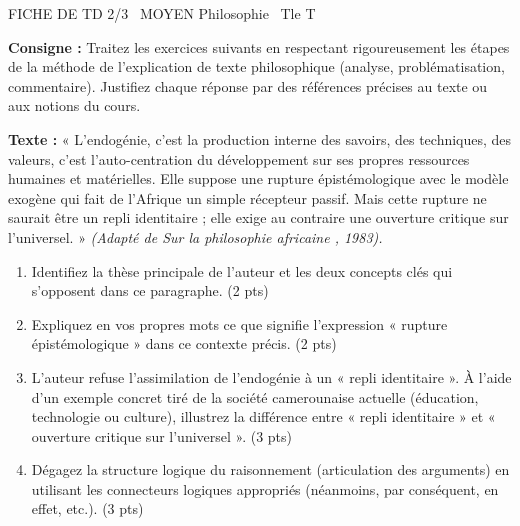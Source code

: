 \documentclass[11pt]{article}
\begin{document}
\begin{tcolorbox}[enhanced,colback=popink,colframe=popink,arc=10pt,boxrule=0pt,left=12pt,right=12pt,top=9pt,bottom=9pt]
{\color{white}\popxbold\small FICHE DE TD 2/3 \textbullet\ MOYEN \hfill Philosophie \textbullet\ Tle T\par}
\end{tcolorbox}
\vspace{4pt}
\noindent \textbf{Consigne :} Traitez les exercices suivants en respectant rigoureusement les étapes de la méthode de l'explication de texte philosophique (analyse, problématisation, commentaire). Justifiez chaque réponse par des références précises au texte ou aux notions du cours.

\begin{exercice}
\textbf{Texte :} « L'endogénie, c'est la production interne des savoirs, des techniques, des valeurs, c'est l'auto-centration du développement sur ses propres ressources humaines et matérielles. Elle suppose une rupture épistémologique avec le modèle exogène qui fait de l'Afrique un simple récepteur passif. Mais cette rupture ne saurait être un repli identitaire ; elle exige au contraire une ouverture critique sur l'universel. » \textit{(Adapté de \og Sur la philosophie africaine \fg{}, 1983).}

\begin{enumerate}
    \item Identifiez la thèse principale de l'auteur et les deux concepts clés qui s'opposent dans ce paragraphe. (2 pts)
    \item Expliquez en vos propres mots ce que signifie l'expression « rupture épistémologique » dans ce contexte précis. (2 pts)
    \item L'auteur refuse l'assimilation de l'endogénie à un « repli identitaire ». À l'aide d'un exemple concret tiré de la société camerounaise actuelle (éducation, technologie ou culture), illustrez la différence entre « repli identitaire » et « ouverture critique sur l'universel ». (3 pts)
    \item Dégagez la structure logique du raisonnement (articulation des arguments) en utilisant les connecteurs logiques appropriés (néanmoins, par conséquent, en effet, etc.). (3 pts)
\end{enumerate}
\end{exercice}
\end{document}
